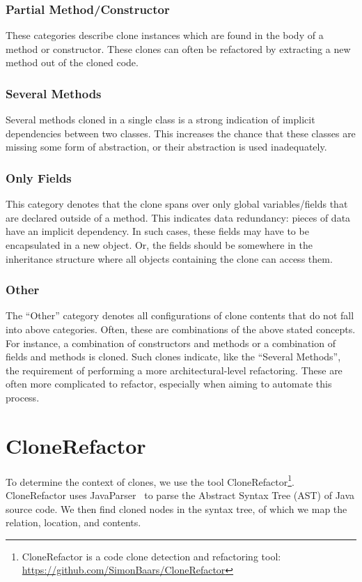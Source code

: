 \documentclass[runningheads]{llncs}
\begin{document}
\subsubsection{Partial Method/Constructor}
These categories describe clone instances which are found in the body of a method or constructor. These clones can often be refactored by extracting a new method out of the cloned code.

\subsubsection{Several Methods}
Several methods cloned in a single class is a strong indication of implicit dependencies between two classes. This increases the chance that these classes are missing some form of abstraction, or their abstraction is used inadequately.

\subsubsection{Only Fields}
This category denotes that the clone spans over only global variables/fields that are declared outside of a method. This indicates data redundancy: pieces of data have an implicit dependency. In such cases, these fields may have to be encapsulated in a new object. Or, the fields should be somewhere in the inheritance structure where all objects containing the clone can access them.

\subsubsection{Other}
The ``Other'' category denotes all configurations of clone contents that do not fall into above categories. Often, these are combinations of the above stated concepts. For instance, a combination of constructors and methods or a combination of fields and methods is cloned. Such clones indicate, like the ``Several Methods'', the requirement of performing a more architectural-level refactoring. These are often more complicated to refactor, especially when aiming to automate this process.

\section{CloneRefactor}
To determine the context of clones, we use the tool CloneRefactor\footnote{CloneRefactor is a code clone detection and refactoring tool: \url{https://github.com/SimonBaars/CloneRefactor}}. CloneRefactor uses JavaParser~\cite{tomassetti2017javaparser} to parse the Abstract Syntax Tree (AST) of Java source code. We then find cloned nodes in the syntax tree, of which we map the relation, location, and contents.
\end{document}
